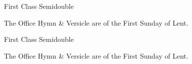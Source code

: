 \fancyhead[RE,LO]{}
\begin{inhead}
    {First Class Semidouble}
\end{inhead}

\begin{rubric}
	The Office Hymn \& Versicle are of the First Sunday of Lent.
\end{rubric}


\fancyhead[RE,LO]{}
\begin{inhead}
    {First Class Semidouble}
\end{inhead}

\begin{rubric}
	The Office Hymn \& Versicle are of the First Sunday of Lent.
\end{rubric}